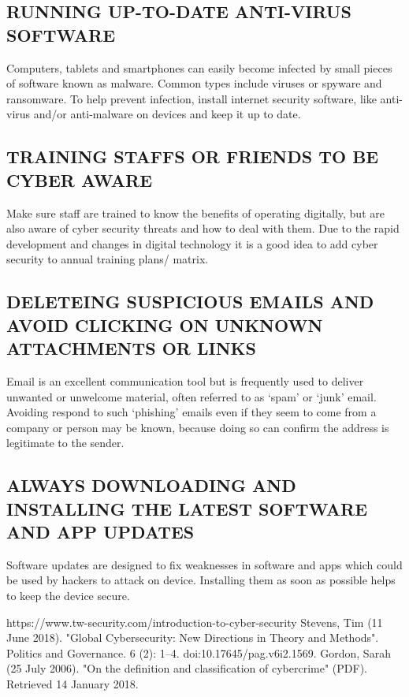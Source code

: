 \documentclass[conference,column]{IEEEtran}
\begin{document}
		\subsection{RUNNING UP-TO-DATE ANTI-VIRUS SOFTWARE}
		 Computers, tablets and smartphones can easily become infected by small pieces of software known as malware. Common types include viruses or spyware and ransomware. To help prevent infection, install internet security software, like anti-virus and/or anti-malware on devices and keep it up to date. 
		\subsection{TRAINING STAFFS OR FRIENDS TO BE CYBER AWARE}
		Make sure staff are trained to know the benefits of operating digitally, but are also aware of cyber security threats and how to deal with them. Due to the rapid development and changes in digital technology it is a good idea to add cyber security to annual training plans/ matrix. 
		\subsection{DELETEING SUSPICIOUS EMAILS AND AVOID CLICKING ON UNKNOWN ATTACHMENTS OR LINKS}
		Email is an excellent communication tool but is frequently used to deliver unwanted or unwelcome material, often referred to as ‘spam’ or ‘junk’ email. Avoiding respond to such ‘phishing’ emails even if they seem to come from a company or person may be known, because doing so can confirm the address is legitimate to the sender. 
		\subsection{ALWAYS DOWNLOADING AND INSTALLING THE LATEST SOFTWARE AND APP UPDATES}
		Software updates are designed to fix weaknesses in software and apps which could be used by hackers to attack on device. Installing them as soon as possible helps to keep the device secure.
		
	\begin{thebibliography}{10}
		https://www.tw-security.com/introduction-to-cyber-security
		Stevens, Tim (11 June 2018). "Global Cybersecurity: New Directions in Theory and Methods". Politics and Governance. 6 (2): 1–4. doi:10.17645/pag.v6i2.1569.
		Gordon, Sarah (25 July 2006). "On the definition and classification of cybercrime" (PDF). Retrieved 14 January 2018.
	\end{thebibliography}
	
	
\end{document}
